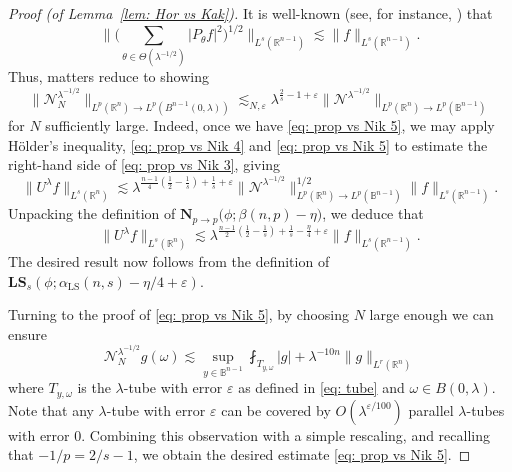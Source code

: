 \documentclass[reqno]{amsart}
\numberwithin{equation}{section}
\newcommand{\B}{\mathbb{B}}
\newcommand{\R}{\mathbb{R}}
\newcommand{\cN}{\mathcal{N}}
\newcommand{\bN}{\mathbf{N}}
\newcommand{\bLS}{\mathbf{LS}}
\theoremstyle{plain}
\theoremstyle{definition}
\begin{document}
\begin{proof}[Proof (of Lemma~\ref{lem: Hor vs Kak})]
It is well-known (see, for instance, \cite{RdF1983}) that
\begin{equation}\label{eq: prop vs Nik 4}
    \Big\| \big(\sum_{\theta \in \Theta(\lambda^{-1/2})} |P_{\theta}f|^2 \big)^{1/2}  \Big\|_{L^s(\R^{n-1})} \lesssim \|f\|_{L^s(\R^{n-1})}.
\end{equation}
Thus, matters reduce to showing
\begin{equation}\label{eq: prop vs Nik 5}
    \|\cN_N^{\lambda^{-1/2}}\|_{L^p(\R^n) \to L^p(B^{n-1}(0,\lambda))} \lesssim_{N, \varepsilon} \lambda^{\frac{2}{s} - 1 + \varepsilon} \|\cN^{\lambda^{-1/2}}\|_{L^p(\R^n) \to L^p(\B^{n-1})}
\end{equation}
for $N$ sufficiently large. Indeed, once we have \eqref{eq: prop vs Nik 5}, we may apply H\"older's inequality, \eqref{eq: prop vs Nik 4} and \eqref{eq: prop vs Nik 5} to estimate the right-hand side of \eqref{eq: prop vs Nik 3}, giving
\begin{equation*}
    \|U^{\lambda}f\|_{L^s(\R^n)} \lesssim \lambda^{\frac{n-1}{4}(\frac{1}{2} - \frac{1}{s}) + \frac{1}{s} + \varepsilon} \|\cN^{\lambda^{-1/2}}\|_{L^p(\R^n) \to L^p(\B^{n-1})}^{1/2}\|f\|_{L^s(\R^{n-1})}.
\end{equation*}
Unpacking the definition of $\bN_{p \to p}\big(\phi;  \beta(n, p) - \eta\big)$, we deduce that
\begin{equation*}
    \|U^{\lambda}f\|_{L^s(\R^n)} \lesssim \lambda^{\frac{n-1}{2}(\frac{1}{2} - \frac{1}{s}) + \frac{1}{s} - \frac{\eta}{4} + \varepsilon} \|f\|_{L^s(\R^{n-1})}.
\end{equation*}
The desired result now follows from the definition of $\bLS_s(\phi; \alpha_{\mathrm{LS}}(n, s) - \eta/4 + \varepsilon)$.

Turning to the proof of \eqref{eq: prop vs Nik 5}, by choosing $N$ large enough we can ensure
\begin{equation*}
\cN_N^{\lambda^{-1/2}}g(\omega) \lesssim \sup_{y \in \B^{n-1}} \fint_{T_{y,\omega}} |g| + \lambda^{-10n} \|g\|_{L^r(\R^n)}
\end{equation*}
where $T_{y,\omega}$ is the $\lambda$-tube with error $\varepsilon$ as defined in \eqref{eq: tube} and $\omega \in B(0,\lambda)$. Note that any $\lambda$-tube with error $\varepsilon$ can be covered by $O(\lambda^{\varepsilon/100})$ parallel $\lambda$-tubes with error $0$. Combining this observation with a simple rescaling, and recalling that $-1/p = 2/s - 1$, we obtain the desired estimate \eqref{eq: prop vs Nik 5}. 
\end{proof}
\end{document}
